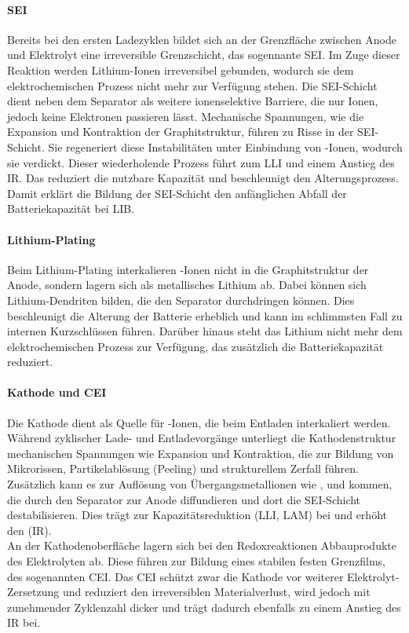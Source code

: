 \paragraph{\acs{SEI}} Bereits bei den ersten Ladezyklen bildet sich an der Grenzfläche zwischen Anode und Elektrolyt eine irreversible Grenzschicht, das sogennante \ac{SEI}. Im Zuge dieser Reaktion werden Lithium-Ionen irreversibel gebunden, wodurch sie dem elektrochemischen Prozess nicht mehr zur Verfügung stehen. Die \acs{SEI}-Schicht dient neben dem Separator als weitere ionenselektive Barriere, die nur Ionen, jedoch keine Elektronen passieren lässt. Mechanische Spannungen, wie die Expansion und Kontraktion der Graphitstruktur, führen zu Risse in der \acs{SEI}-Schicht. Sie regeneriert diese Instabilitäten unter Einbindung von -Ionen, wodurch sie verdickt. Dieser wiederholende Prozess führt zum \acs{LLI} und einem Anstieg des \acs{IR}. Das reduziert die nutzbare Kapazität und beschleunigt den Alterungsprozess. Damit erklärt die Bildung der \acs{SEI}-Schicht den anfänglichen Abfall der Batteriekapazität bei \acs{LIB}.

\paragraph{Lithium-Plating} Beim Lithium-Plating interkalieren -Ionen nicht in die Graphitstruktur der Anode, sondern lagern sich als metallisches Lithium ab. Dabei können sich Lithium-Dendriten bilden, die den Separator durchdringen können. Dies beschleunigt die Alterung der Batterie erheblich und kann im schlimmsten Fall zu internen Kurzschlüssen führen. Darüber hinaus steht das Lithium nicht mehr dem elektrochemischen Prozess zur Verfügung, das zusätzlich die Batteriekapazität reduziert.

\paragraph{Kathode und CEI} Die Kathode dient als Quelle für -Ionen, die beim Entladen interkaliert werden. Während zyklischer Lade- und Entladevorgänge unterliegt die Kathodenstruktur mechanischen Spannungen wie Expansion und Kontraktion, die zur Bildung von Mikrorissen, Partikelablösung (Peeling) und strukturellem Zerfall führen. Zusätzlich kann es zur Auflösung von Übergangsmetallionen wie ,  und  kommen, die durch den Separator zur Anode diffundieren und dort die \acs{SEI}-Schicht destabilisieren. Dies trägt zur Kapazitätsreduktion (\acs{LLI}, \acs{LAM}) bei und erhöht den (\acs{IR}).\\
An der Kathodenoberfläche lagern sich bei den Redoxreaktionen Abbauprodukte des Elektrolyten ab. Diese führen zur Bildung eines stabilen festen Grenzfilms, des sogenannten \ac{CEI}. Das \acs{CEI} schützt zwar die Kathode vor weiterer Elektrolyt-Zersetzung und reduziert den irreversiblen Materialverlust, wird jedoch mit zunehmender Zyklenzahl dicker und trägt dadurch ebenfalls zu einem Anstieg des \acs{IR} bei.

